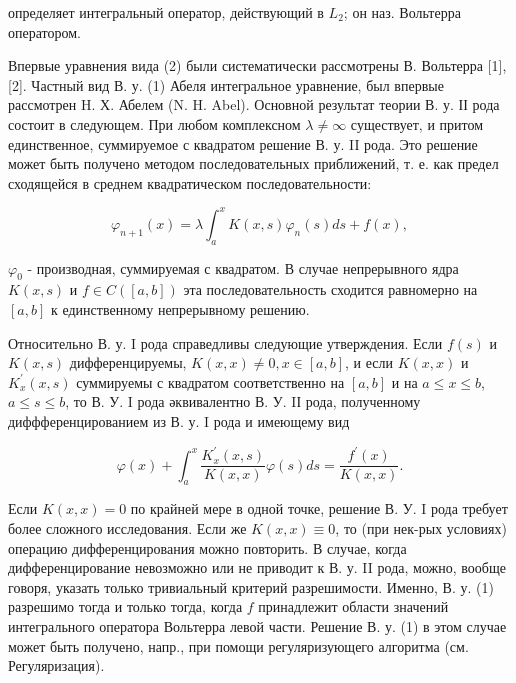 \documentclass[10pt]{article}
\begin{document}
определяет интегральный оператор, действующий в $L_{2}$; он наз. Вольтерра оператором.



Впервые уравнения вида (2) были систематически рассмотрены В. Вольтерра [1], [2]. Частный вид В. у. (1) Абеля интегральное уравнение, был впервые рассмотрен H. Х. Абелем (N. H. Abel). Основной результат теории В. у. ІІ рода состоит в следующем. При любом комплексном $\lambda \neq \infty$ существует, и притом единственное, суммируемое с квадратом решение В. у. II рода. Это решение может быть получено методом последовательных приближений, т. е. как предел сходящейся в среднем квадратическом последовательности:



\[

\varphi_{n+1}(x)=\lambda \int_{a}^{x} K(x, s) \varphi_{n}(s) d s+f(x),

\]



$\varphi_{0}$ - производная, суммируемая с квадратом. В случае непрерывного ядра $K(x, s)$ и $f \in C([a, b])$ эта последовательность сходится равномерно на $[a, b]$ к единственному непрерывному решению.



Относительно В. у. I рода справедливы следующие утверждения. Если $f(s)$ и $K(x, s)$ дифференцируемы, $K(x, x) \neq 0, x \in[a, b]$, и если $K(x, x)$ и $K_{x}^{\prime}(x, s)$ суммируемы с квадратом соответственно на $[a, b]$ и на $a \leqslant x \leqslant b$, $a \leqslant s \leqslant b$, то В. У. I рода әквивалентно В. У. IІ рода, полученному диффференцированием из В. у. I рода и имеющему вид



\[

\varphi(x)+\int_{a}^{x} \frac{K_{x}^{\prime}(x, s)}{K(x, x)} \varphi(s) d s=\frac{f^{\prime}(x)}{K(x, x)} .

\]



Если $K(x, x)=0$ по крайней мере в одной точке, решение В. У. I рода требует более сложного исследования. Если же $K(x, x) \equiv 0$, то (при нек-рых условиях) операцию дифференцирования можно повторить. В случае, когда дифференцирование невозможно или не приводит к В. у. II рода, можно, вообще говоря, указать только тривиальный критерий разрешимости. Именно, В. у. (1) разрешимо тогда и только тогда, когда $f$ принадлежит области значений интегрального оператора Вольтерра левой части. Решение В. у. (1) в этом случае может быть получено, напр., при помощи регуляризующего алгоритма (см. Регуляризация).
\end{document}
